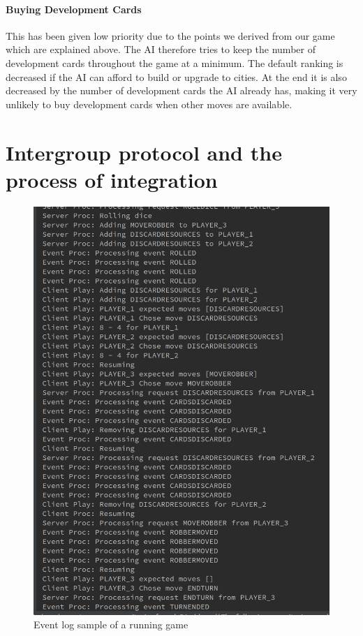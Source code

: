 \documentclass[a4paper,doc]{apa6}
\begin{document}
\paragraph{Buying Development Cards}
	This has been given low priority due to the points we derived from our game which are explained above. The AI therefore tries to keep the number of development cards throughout the game at a minimum. The default ranking is decreased if the AI can afford to build or upgrade to cities. At the end it is also decreased by the number of development cards the AI already has, making it very unlikely to buy development cards when other moves are available.


\section{Intergroup protocol and the process of integration}
\begin{figure}[hbtp]
      \includegraphics[width=\textwidth]{eventlog}
      \caption{Event log sample of a running game}
\end{figure}
\end{document}

